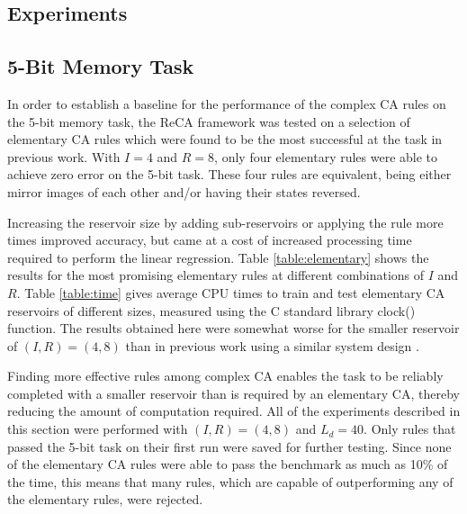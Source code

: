 \documentclass{elsarticle}
\begin{document}
\begin{multicols}{2}
    \section{Experiments}\label{experiment}
\subsection{5-Bit Memory Task}
In order to establish a baseline for the performance of the complex CA rules on 
    the 5-bit memory task, the ReCA framework was tested on a selection of 
    elementary CA rules which were found to be the most successful at the task 
    in previous work\cite{yilmaz2014reservoir}\cite{bye2016investigation}. With 
    $I = 4$ and $R = 8$, only four elementary rules were able to achieve zero 
    error on the 5-bit task. These four rules are equivalent, being either 
    mirror images of each other and/or having their states reversed.\par 
    Increasing the reservoir size by adding sub-reservoirs or applying the rule 
    more times improved accuracy, but came at a cost of increased processing 
    time required to perform the linear regression.  Table 
    \ref{table:elementary} shows the results for the most promising elementary 
    rules at different combinations of $I$ and $R$.  Table \ref{table:time} 
gives average CPU times to train and test elementary CA reservoirs of different 
   sizes, measured using the C standard library clock() function. The results 
   obtained here were somewhat worse for the smaller reservoir of $(I,R) = 
   (4,8)$ than in previous work using a similar system design  
   \cite{yilmaz2014reservoir}\cite{bye2016investigation}\cite{nichele2017reservoir}.  
   \par Finding more effective rules among complex CA enables the task to be 
   reliably completed with a smaller reservoir than is required by an 
   elementary CA, thereby reducing the amount of computation required.  All of 
   the experiments described in this section were performed with $(I,R) = 
   (4,8)$ and $L_{d} = 40$.  Only rules that passed the 5-bit task on their 
   first run were saved for further testing.  Since none of the elementary CA 
   rules were able to pass the benchmark as much as 10\% of the time, this 
   means that many rules, which are capable of outperforming any of the 
   elementary rules, were rejected. 



\end{multicols}
\end{document}
